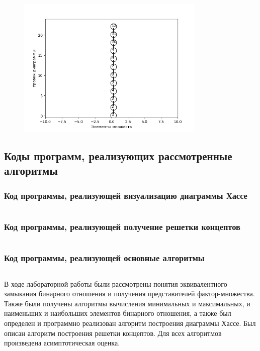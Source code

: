 \documentclass[bachelor, och, labwork]{shiza}
\begin{document}
        \begin{figure}[H]
            \centering
            \includegraphics[width=0.8\textwidth]{pic/7.png}
            \caption{}
        \end{figure}
    
    \subsection{Коды программ, реализующих рассмотренные алгоритмы}
        \subsubsection{Код программы, реализующей визуализацию диаграммы Хассе}
            \inputminted{python}{code/hassevisualization.py}
        \subsubsection{Код программы, реализующей получение решетки концептов}
            \inputminted{python}{code/latticeofconcepts.py}
        \subsubsection{Код программы, реализующей основные алгоритмы}
            \inputminted{python}{code/lab2.py}
      


\conclusion
В ходе лабораторной работы были рассмотрены понятия эквивалентного замыкания
бинарного отношения и получения представителей фактор-множества. Также были
получены алгоритмы вычисления минимальных и максимальных, и наименьших и наибольших
элементов бинарного отношения, а также был определен и программно реализован
алгоритм построения диаграммы Хассе. Был описан алгоритм построения решетки
концептов. Для всех алгоритмов произведена асимптотическая оценка.
\end{document}
